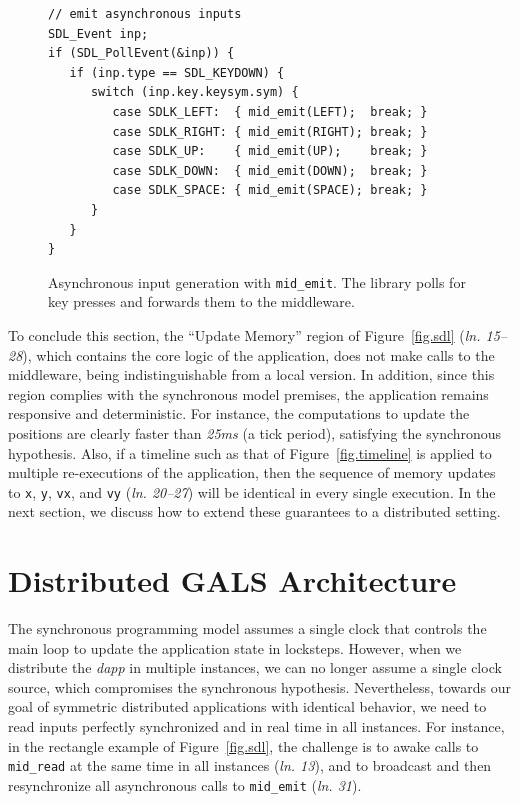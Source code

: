 \documentclass[sigplan,screen]{acmart}
\newcommand{\lin}[1]{(\emph{ln. #1}\xspace)}
\newcommand{\dapp}{\emph{dapp}\xspace}
\begin{document}
\begin{figure}[t]
{\scriptsize
\begin{verbatim}
// emit asynchronous inputs
SDL_Event inp;
if (SDL_PollEvent(&inp)) {
   if (inp.type == SDL_KEYDOWN) {
      switch (inp.key.keysym.sym) {
         case SDLK_LEFT:  { mid_emit(LEFT);  break; }
         case SDLK_RIGHT: { mid_emit(RIGHT); break; }
         case SDLK_UP:    { mid_emit(UP);    break; }
         case SDLK_DOWN:  { mid_emit(DOWN);  break; }
         case SDLK_SPACE: { mid_emit(SPACE); break; }
      }
   }
}
\end{verbatim}
}
  \caption{
    \label{fig.input}
    Asynchronous input generation with \texttt{mid\_emit}.
    The library polls for key presses and forwards them to the middleware.
  }
\end{figure}

To conclude this section, the ``Update Memory'' region of Figure~\ref{fig.sdl}
\lin{15--28}, which contains the core logic of the application, does not make
calls to the
middleware, being indistinguishable from a local version.
In addition, since this region complies with the synchronous model premises,
the application remains responsive and deterministic.
For instance, the computations to update the positions are clearly faster than
\emph{25ms} (a tick period), satisfying the synchronous hypothesis.
Also, if a timeline such as that of Figure~\ref{fig.timeline} is applied to
multiple re-executions of the application, then the sequence of memory updates
to \texttt{x}, \texttt{y}, \texttt{vx}, and \texttt{vy} \lin{20--27} will be
identical in every single execution.
In the next section, we discuss how to extend these guarantees to a distributed
setting.

\section{Distributed GALS Architecture}
\label{sec.gals}

The synchronous programming model assumes a single clock that controls the main
loop to update the application state in locksteps.
However, when we distribute the \dapp in multiple instances, we can no longer
assume a single clock source, which compromises the synchronous hypothesis.
%
Nevertheless, towards our goal of symmetric distributed applications with
identical behavior, we need to read inputs perfectly synchronized and in real
time in all instances.
For instance, in the rectangle example of Figure~\ref{fig.sdl}, the challenge
is
    to awake calls to \texttt{mid\_read} at the same time in all instances \lin{13}, and
    to broadcast and then resynchronize all asynchronous calls to \texttt{mid\_emit} \lin{31}.
\end{document}
